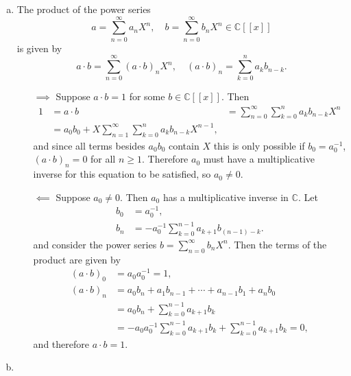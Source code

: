 \documentclass{article}
\begin{document}
\begin{Answer}
  \begin{enumerate}[(a)]
    \item{
      The product of the power series
      $$
      a = \sum_{n=0}^\infty a_n X^n, \quad
      b = \sum_{n=0}^\infty b_n X^n \in \mathbb{C}[[x]]
      $$
      is given by
      $$
      a \cdot b = \sum_{n=0}^\infty(a \cdot b)_n X^n, \quad
      (a \cdot b)_n = \sum_{k=0}^n a_k b_{n-k}.
      $$
      \begin{itemize}
        \item[$\implies$]{
          Suppose $a \cdot b = 1$ for some $b \in
          \mathbb{C}[[x]]$. Then
          \begin{align*}
             1
          &= a \cdot b
          &= \sum_{n=0}^\infty \sum_{k=0}^n a_k b_{n-k} X^n \\
          &= a_0 b_0
           + X \sum_{n=1}^\infty \sum_{k=0}^n a_k b_{n-k} X^{n-1},
          \end{align*}
          and since all terms besides $a_0 b_0$ contain $X$ this is
          only possible if $b_0 = a_0^{-1}$, $(a \cdot b)_n = 0$ for
          all $n \geq 1$. Therefore $a_0$ must have a multiplicative
          inverse for this equation to be satisfied, so $a_0 \neq 0$.
        }
        \item[$\impliedby$]{
          Suppose $a_0 \neq 0$. Then $a_0$ has a multiplicative
          inverse in $\mathbb{C}$. Let
          \begin{align*}
            b_0 &= a_0^{-1}, \\
            b_n &= -a_0^{-1} \sum_{k=0}^{n-1} a_{k+1} b_{(n-1)-k}.
          \end{align*}
          and consider the power series $b = \sum_{n=0}^\infty b_n
          X^n$. Then the terms of the product are given by
          \begin{align*}
             (a \cdot b)_0
          &= a_0 a_0^{-1} = 1, \\
             (a \cdot b)_n
          &= a_0 b_n + a_1 b_{n-1} + \cdots + a_{n-1} b_1 + a_n b_0 \\
          &= a_0 b_n + \sum_{k=0}^{n-1} a_{k+1} b_k \\
          &= -a_0 a_0^{-1} \sum_{k=0}^{n-1} a_{k+1} b_k
           + \sum_{k=0}^{n-1} a_{k+1} b_k
           = 0,
          \end{align*}
          and therefore $a \cdot b = 1$.
        }
      \end{itemize}
    }
    \item{
}
\end{enumerate}
\end{Answer}
\end{document}

